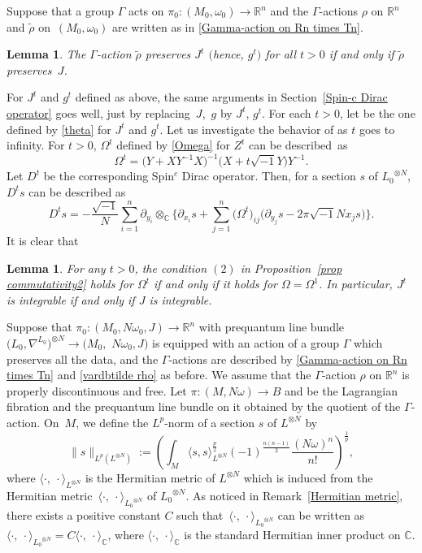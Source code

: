 \documentclass[pdftex]{sigma}
\numberwithin{equation}{section}
\newtheorem{Lemma}[Theorem]{Lemma}
\newcommand{\C}{\mathbb{C}}
\newcommand{\R}{\mathbb{R}}
\renewcommand{\tilde}{\widetilde}
\newcommand{\norm}[1]{\lVert#1\rVert}
\begin{document}
Suppose that a group $\Gamma$ acts on $\pi_0\colon (M_0,\omega_0)\to \R^n$ and the $\Gamma$-actions $\rho$ on $\R^n$ and $\tilde \rho$ on~${(M_0,\omega_0)}$ are written as in \eqref{Gamma-action on Rn times Tn}. %
\begin{Lemma}
The $\Gamma$-action $\tilde \rho$ preserves $J^t$ $($hence, $g^t)$ for all $t>0$ if and only if $\tilde \rho$ preserves~$J$.
\end{Lemma}


For $J^t$ and $g^t$ defined as above, the same arguments in Section~\ref{Spin-c Dirac operator} goes well, just by replacing~$J$,~$g$ by $J^t$, $g^t$. For each $t>0$, let  be the one defined by \eqref{theta} for $J^t$ and $g^t$. Let us investigate the behavior of  as $t$ goes to infinity.
%
For $t>0$, $\Omega^t$ defined by \eqref{Omega} for $Z^t$ can be described~as
\begin{equation}\label{Omega-t}
\Omega^t=\bigl(Y+XY^{-1}X\bigr)^{-1}\bigl(X+t\sqrt{-1}Y\bigr)Y^{-1}.
\end{equation}
Let $D^t$ be the corresponding Spin${}^c$ Dirac operator. Then, for a section $s$ of ${L_0}^{\otimes N}$, $D^ts$ can be described as
\[%
D^ts=-\frac{\sqrt{-1}}{N}\sum_{i=1}^n\partial_{y_i}\otimes_{\C}\biggl\{\partial_{x_i}s+\sum_{j=1}^n\bigl(\Omega^t\bigr)_{ij}\bigl(\partial_{y_j}s -2\pi\sqrt{-1}Nx_js\bigr)\biggr\}.
\]
It is clear that
\begin{Lemma}
For any $t>0$, the condition $(2)$ in Proposition~{\rm\ref{prop commutativity2}} holds for $\Omega^t$ if and only if it holds for $\Omega=\Omega^1$. In particular, $J^t$ is integrable if and only if $J$ is integrable.
\end{Lemma}
Suppose that $\pi_0\colon (M_0,N\omega_0,J)\to \R^n$ with prequantum line bundle $\bigl({L_0}, \nabla^{L_0}\bigr)^{\otimes N}\to (M_0,$ $N\omega_0, J)$ is equipped with an action of a group $\Gamma$ which preserves all the data, and the $\Gamma$-actions are described by \eqref{Gamma-action on Rn times Tn} and \eqref{vardbtilde rho} as before. We assume that the $\Gamma$-action $\rho$ on $\R^n$ is properly discontinuous and free. Let $\pi \colon (M,N\omega)\to B$ and  be the Lagrangian fibration and the prequantum line bundle on it obtained by the quotient of the $\Gamma$-action.
On~$M$, we define the $L^p$-norm of a section $s$ of $L^{\otimes N}$ by
\[%
\norm{s}_{L^p(L^{\otimes N})}:=\left(\int_M\langle s, s\rangle_{L^{\otimes N}}^{\frac{p}{2}} (-1)^{\frac{n(n-1)}{2}}\dfrac{(N\omega)^n}{n!}\right)^\frac{1}{p},
\]
where $\langle \cdot ,\ \cdot \rangle_{L^{\otimes N}}$ is the Hermitian metric of $L^{\otimes N}$ which is induced from the Hermitian metric~${\langle \cdot ,\ \cdot \rangle_{{L_0}^{\otimes N}}}$ of ${L_0}^{\otimes N}$. As noticed in Remark~\ref{Hermitian metric},
there exists a positive constant $C$ such that~${\langle \cdot ,\ \cdot \rangle_{{L_0}^{\otimes N}}}$ can be written as $\langle \cdot ,\ \cdot \rangle_{{L_0}^{\otimes N}} =C \langle \cdot ,\ \cdot \rangle_{\C}$, where $\langle \cdot ,\ \cdot \rangle_{\C}$ is the standard Hermitian inner product on $\C$.
\end{document}
